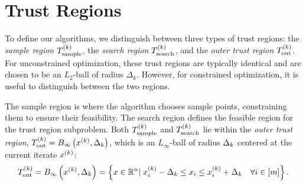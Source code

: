 %
%



\section{Trust Regions}

\label{trust_regions_section}

To define our algorithms, we distinguish between three types of trust regions: 
the {\em sample region} ${T_{\text{sample}}^{(k)}}$,
the {\em search region} ${T_{\text{search}}^{(k)}}$,
and the {\em outer trust region} ${T_{\text{out}}^{(k)}}$.
For unconstrained optimization,  these trust regions are typically identical and are chosen to be an $L_2$-ball of radius $\Delta_k$.
However, for constrained optimization, it is useful to distinguish between the two regions.



The sample region is where the algorithm chooses sample points, constraining them to ensure their feasibility.
The search region defines the feasible region for the trust region subproblem.
Both ${T_{\text{sample}}^{(k)}}$ and ${T_{\text{search}}^{(k)}}$ lie within the {\em outer trust region},
${T_{\text{out}}^{(k)}} = B_{\infty}\left(x^{(k)}, \Delta_k\right)$, which is an $L_{\infty}$-ball of radius $\Delta_k$ centered at the current iterate $x^{(k)}$:
\begin{align}
\label{define_outer_trust_region}
{T_{\text{out}}^{(k)}} = B_{\infty}\left(x^{(k)},\Delta_k\right) = \left\{x\in \mathbb R^n | \; x_i^{(k)} - \Delta_k \le x_i \le x_i^{(k)} + \Delta_k \quad \forall i \in [m] \right \}.
\end{align}

